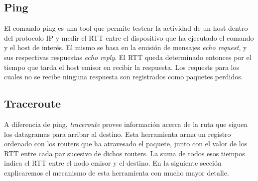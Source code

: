 \subsection{Ping}

El comando ping es una tool que permite testear la actividad de un host dentro del protocolo IP y medir
el RTT entre el dispositivo que ha ejecutado el comando y el host de inter\'es. El mismo se basa en
la emisi\'on de mensajes \emph{echo request}, y sus respectivas respuestas \emph{echo reply}. El RTT queda
determinado entonces por el tiempo que tarda el host emisor en recibir la respuesta.
Los requests para los cuales no se recibe ninguna respuesta son registrados como paquetes perdidos.

\subsection{Traceroute}

A diferencia de ping, \emph{traceroute} provee informaci\'on acerca de la ruta que siguen los datagramas
para arribar al destino. Esta herramienta arma un registro ordenado con los routers que ha atravesado
el paquete, junto con el valor de los RTT entre cada par sucesivo de dichos routers. La suma de todos
esos tiempos indica el RTT entre el nodo emisor y el destino. En la siguiente secci\'on explicaremos el
mecanismo de esta herramienta con mucho mayor detalle.
